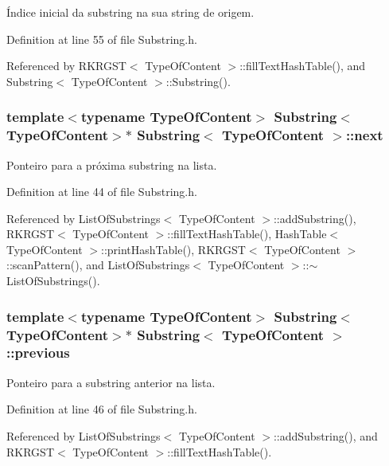 Índice inicial da substring na sua string de origem. 



Definition at line 55 of file Substring.\+h.



Referenced by R\+K\+R\+G\+S\+T$<$ Type\+Of\+Content $>$\+::fill\+Text\+Hash\+Table(), and Substring$<$ Type\+Of\+Content $>$\+::\+Substring().

\hypertarget{classSubstring_a5965b296a10e4a5fd874913f07754451}{
\subsubsection[{next}]{\setlength{\rightskip}{0pt plus 5cm}template$<$typename Type\+Of\+Content$>$ {\bf Substring}$<$Type\+Of\+Content$>$$\ast$ {\bf Substring}$<$ Type\+Of\+Content $>$\+::next}}\label{classSubstring_a5965b296a10e4a5fd874913f07754451}


Ponteiro para a próxima substring na lista. 



Definition at line 44 of file Substring.\+h.



Referenced by List\+Of\+Substrings$<$ Type\+Of\+Content $>$\+::add\+Substring(), R\+K\+R\+G\+S\+T$<$ Type\+Of\+Content $>$\+::fill\+Text\+Hash\+Table(), Hash\+Table$<$ Type\+Of\+Content $>$\+::print\+Hash\+Table(), R\+K\+R\+G\+S\+T$<$ Type\+Of\+Content $>$\+::scan\+Pattern(), and List\+Of\+Substrings$<$ Type\+Of\+Content $>$\+::$\sim$\+List\+Of\+Substrings().

\hypertarget{classSubstring_a992d0f85409426c420d243ac18d2bca5}{
\subsubsection[{previous}]{\setlength{\rightskip}{0pt plus 5cm}template$<$typename Type\+Of\+Content$>$ {\bf Substring}$<$Type\+Of\+Content$>$$\ast$ {\bf Substring}$<$ Type\+Of\+Content $>$\+::previous}}\label{classSubstring_a992d0f85409426c420d243ac18d2bca5}


Ponteiro para a substring anterior na lista. 



Definition at line 46 of file Substring.\+h.



Referenced by List\+Of\+Substrings$<$ Type\+Of\+Content $>$\+::add\+Substring(), and R\+K\+R\+G\+S\+T$<$ Type\+Of\+Content $>$\+::fill\+Text\+Hash\+Table().

